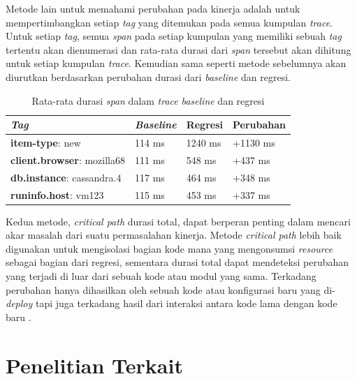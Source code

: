 Metode lain untuk memahami perubahan pada kinerja adalah untuk mempertimbangkan setiap \textit{tag} yang ditemukan pada semua kumpulan \textit{trace}. Untuk setiap \textit{tag}, semua \textit{span} pada setiap kumpulan yang memiliki sebuah \textit{tag} tertentu akan dienumerasi dan rata-rata durasi dari \textit{span} tersebut akan dihitung untuk setiap kumpulan \textit{trace}. Kemudian sama seperti metode sebelumnya akan diurutkan berdasarkan perubahan durasi dari \textit{baseline} dan regresi.

\begin{small}
	\begin{longtable}{ | p{5cm} | p{2cm} | p{2cm} | p{2cm} | }
		\caption{Rata-rata durasi \textit{span} dalam \textit{trace} \textit{baseline} dan regresi}
		\label{corr-tab-3}                                                           
		\\ \hline
		\centering\bfseries{\textit{Tag}} & \centering\bfseries{\textit{Baseline}} & \centering\bfseries{Regresi} & \centering\bfseries{Perubahan} \tabularnewline \hline
		\endfirsthead
		\textbf{item-type}: new & 114 ms & 1240 ms & +1130 ms \\ \hline
		\textbf{client.browser}: mozilla68 & 111 ms & 548 ms & +437 ms \\ \hline
		\textbf{db.instance}: cassandra.4 & 117 ms & 464 ms & +348 ms \\ \hline
		\textbf{runinfo.host}: vm123 & 115 ms & 453 ms & +337 ms \\ \hline
	\end{longtable}
\end{small}

Kedua metode, \textit{critical path} durasi total, dapat berperan penting dalam mencari akar masalah dari suatu permasalahan kinerja. Metode \textit{critical path} lebih baik digunakan untuk mengisolasi bagian kode mana yang mengonsumsi \textit{resource} sebagai bagian dari regresi, sementara durasi total dapat mendeteksi perubahan yang terjadi di luar dari sebuah kode atau modul yang sama. Terkadang perubahan hanya dihasilkan oleh sebuah kode atau konfigurasi baru yang di-\textit{deploy} tapi juga terkadang hasil dari interaksi antara kode lama dengan kode baru \citep{parker2020distributed}. 

\section{Penelitian Terkait}

%

